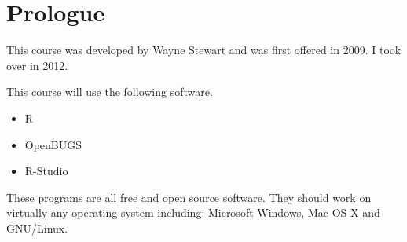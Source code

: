 \section{Prologue}

This course was developed by Wayne Stewart and was first offered in 2009.
I took over in 2012.

This course will use the following software.
\begin{itemize}
\item R
\item OpenBUGS
\item R-Studio
\end{itemize}

These programs are all free and open source software. They should work on
virtually any operating system including: Microsoft Windows, Mac OS X and
GNU/Linux.

